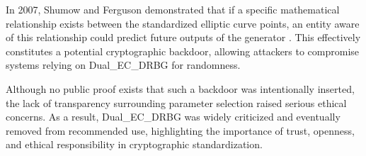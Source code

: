 \documentclass[12pt,letterpaper]{article}
\begin{document}

In 2007, Shumow and Ferguson demonstrated that if a specific mathematical relationship exists between the standardized elliptic curve points, an entity aware of this relationship could predict future outputs of the generator \cite{shumow2007dualec}. This effectively constitutes a potential cryptographic backdoor, allowing attackers to compromise systems relying on Dual\_EC\_DRBG for randomness.

Although no public proof exists that such a backdoor was intentionally inserted, the lack of transparency surrounding parameter selection raised serious ethical concerns. As a result, Dual\_EC\_DRBG was widely criticized and eventually removed from recommended use, highlighting the importance of trust, openness, and ethical responsibility in cryptographic standardization.
\end{document}
